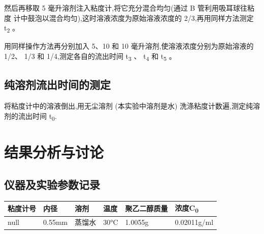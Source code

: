 \documentclass[11pt]{report}
\begin{document}
然后再移取 5 毫升溶剂注入粘度计,将它充分混合均匀(通过 B 管利用吸耳球往粘度
计中鼓泡以混合均匀),这时溶液浓度为原始溶液浓度的 2/3,再用同样方法测定 t\textsubscript{2} 。

用同样操作方法再分别加入 5、10 和 10 毫升溶剂,使溶液浓度分别为原始溶液的 1/2、
1/3 和 1/4,测定各自的流出时间 t\textsubscript{3} 、 t\textsubscript{4} 和 t\textsubscript{5} 。

\section{纯溶剂流出时间的测定}
\label{sec:org0d8f75f}
将粘度计中的溶液倒出,用无尘溶剂 (本实验中溶剂是水) 洗涤粘度计数遍,测定纯溶
剂的流出时间 t\textsubscript{0}.

\chapter{结果分析与讨论}
\label{sec:org9bc067f}
\section{仪器及实验参数记录}
\label{sec:org47afb8f}
\begin{center}
\begin{tabular}{llllll}
粘度计号 & 内径 & 溶剂 & 温度 & 聚乙二醇质量 & 浓度C\textsubscript{0}\\
\hline
null & 0.55mm & 蒸馏水 & 30°C & 1.0055g & 0.02011g/ml\\
\end{tabular}
\end{center}
\end{document}

